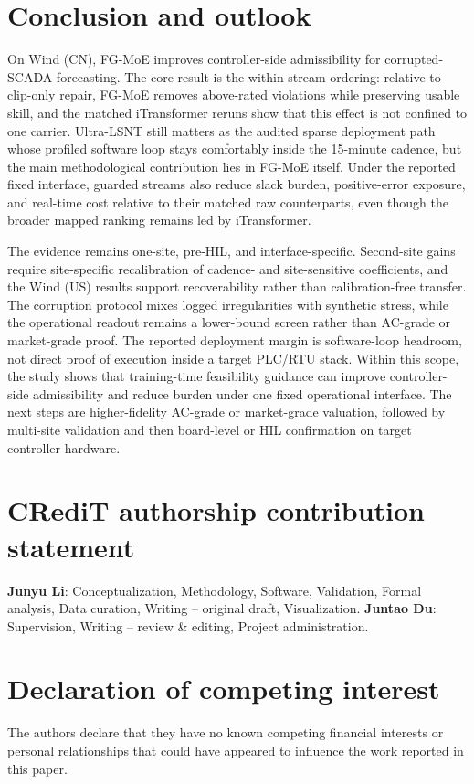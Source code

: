 \documentclass[review,1p,times]{elsarticle}
\begin{document}
\section{Conclusion and outlook}
\label{sec:conclusion}

On Wind (CN), FG-MoE improves controller-side admissibility for corrupted-SCADA forecasting. The core result is the within-stream ordering: relative to clip-only repair, FG-MoE removes above-rated violations while preserving usable skill, and the matched iTransformer reruns show that this effect is not confined to one carrier. Ultra-LSNT still matters as the audited sparse deployment path whose profiled software loop stays comfortably inside the 15-minute cadence, but the main methodological contribution lies in FG-MoE itself. Under the reported fixed interface, guarded streams also reduce slack burden, positive-error exposure, and real-time cost relative to their matched raw counterparts, even though the broader mapped ranking remains led by iTransformer.

The evidence remains one-site, pre-HIL, and interface-specific. Second-site gains require site-specific recalibration of cadence- and site-sensitive coefficients, and the Wind (US) results support recoverability rather than calibration-free transfer. The corruption protocol mixes logged irregularities with synthetic stress, while the operational readout remains a lower-bound screen rather than AC-grade or market-grade proof. The reported deployment margin is software-loop headroom, not direct proof of execution inside a target PLC/RTU stack. Within this scope, the study shows that training-time feasibility guidance can improve controller-side admissibility and reduce burden under one fixed operational interface. The next steps are higher-fidelity AC-grade or market-grade valuation, followed by multi-site validation and then board-level or HIL confirmation on target controller hardware.

\section*{CRediT authorship contribution statement}
\textbf{Junyu Li}: Conceptualization, Methodology, Software, Validation, Formal analysis, Data curation, Writing -- original draft, Visualization.
\textbf{Juntao Du}: Supervision, Writing -- review \& editing, Project administration.

\section*{Declaration of competing interest}
The authors declare that they have no known competing financial interests or personal relationships that could have appeared to influence the work reported in this paper.
\end{document}
